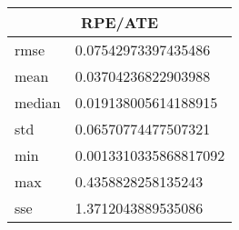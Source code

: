\begin{table}[!ht] 
 \centering 
 \begin{tabular}{|l|l|} \hline 
 \multicolumn{2}{|c|}{RPE/ATE} \\ \hline 
 rmse & 0.07542973397435486 \\ \hline 
mean & 0.03704236822903988 \\ \hline 
median & 0.019138005614188915 \\ \hline 
std & 0.06570774477507321 \\ \hline 
min & 0.0013310335868817092 \\ \hline 
max & 0.4358828258135243 \\ \hline 
sse & 1.3712043889535086 \\ \hline 
\end{tabular} 
 \end{table}